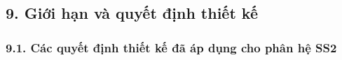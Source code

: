 \documentclass[11pt,a4paper]{article}
\begin{document}
\hypertarget{giux1edbi-hux1ea1n-vuxe0-quyux1ebft-ux111ux1ecbnh-thiux1ebft-kux1ebf}{%
\subsection{9. Giới hạn và quyết định thiết
kế}\label{giux1edbi-hux1ea1n-vuxe0-quyux1ebft-ux111ux1ecbnh-thiux1ebft-kux1ebf}}

\hypertarget{cuxe1c-quyux1ebft-ux111ux1ecbnh-thiux1ebft-kux1ebf-ux111uxe3-uxe1p-dux1ee5ng-cho-phuxe2n-hux1ec7-ss2}{%
\subsubsection{9.1. Các quyết định thiết kế đã áp dụng cho phân hệ
SS2}\label{cuxe1c-quyux1ebft-ux111ux1ecbnh-thiux1ebft-kux1ebf-ux111uxe3-uxe1p-dux1ee5ng-cho-phuxe2n-hux1ec7-ss2}}
\end{document}
